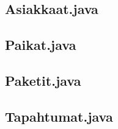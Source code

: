\documentclass[11pt,a4paper]{article}
\begin{document}
\subsection*{Asiakkaat.java}

\subsection*{Paikat.java}

\subsection*{Paketit.java}

\subsection*{Tapahtumat.java}

\end{document}
